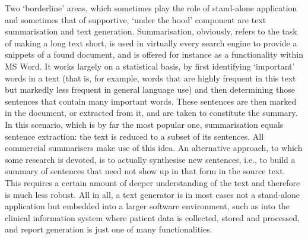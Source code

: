 \documentclass{scrartcl}
\begin{document}
\begin{Parallel}[c]{70mm}{70mm}
{    Two `borderline' areas, which sometimes play the role of stand-alone application and sometimes that of supportive, `under the hood' component are text summarisation and text generation. Summarisation, obviously, refers to the task of making a long text short, is used in virtually every search engine to provide a snippets of a found document, and is offered for instance as a functionality within MS Word. It works largely on a statistical basis, by first identifying `important' words in a text (that is, for example, words that are highly frequent in this text but markedly less frequent in general language use) and then determining those sentences that contain many important words. These sentences are then marked in the document, or extracted from it, and are taken to constitute the summary. In this scenario, which is by far the most popular one, summarisation equals sentence extraction: the text is reduced to a subset of its sentences. All commercial summarisers make use of this idea. An alternative approach, to which some research is devoted, is to actually synthesise new sentences, i.e., to build a summary of sentences that need not show up in that form in the source text. This requires a certain amount of deeper understanding of the text and therefore is much less robust. All in all, a text generator is in most cases not a stand-alone application but embedded into a larger software environment, such as into the clinical information system where patient data is collected, stored and processed, and report generation is just one of many functionalities.

}
\end{Parallel}
\end{document}
